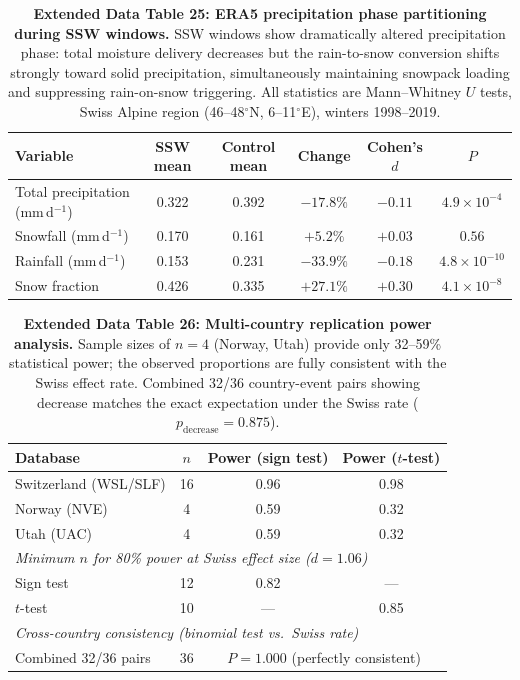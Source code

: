 \documentclass[11pt,letterpaper]{article}
\begin{document}
\begin{table}[!ht]
\centering
\caption{\textbf{Extended Data Table 25: ERA5 precipitation phase partitioning during SSW windows.}
SSW windows show dramatically altered precipitation phase: total moisture delivery decreases but the rain-to-snow conversion shifts strongly toward solid precipitation, simultaneously maintaining snowpack loading and suppressing rain-on-snow triggering. All statistics are Mann--Whitney $U$ tests, Swiss Alpine region (46--48$^\circ$N, 6--11$^\circ$E), winters 1998--2019.}
\label{tab:precip_phase}
\small
\begin{tabular}{lccccc}
\toprule
Variable & SSW mean & Control mean & Change & Cohen's $d$ & $P$ \\
\midrule
Total precipitation (mm\,d$^{-1}$) & 0.322 & 0.392 & $-17.8\%$ & $-0.11$ & $4.9 \times 10^{-4}$ \\
Snowfall (mm\,d$^{-1}$) & 0.170 & 0.161 & $+5.2\%$ & $+0.03$ & $0.56$ \\
Rainfall (mm\,d$^{-1}$) & 0.153 & 0.231 & $-33.9\%$ & $-0.18$ & $4.8 \times 10^{-10}$ \\
Snow fraction & 0.426 & 0.335 & $+27.1\%$ & $+0.30$ & $4.1 \times 10^{-8}$ \\
\bottomrule
\end{tabular}
\end{table}

\begin{table}[!ht]
\centering
\caption{\textbf{Extended Data Table 26: Multi-country replication power analysis.}
Sample sizes of $n = 4$ (Norway, Utah) provide only 32--59\% statistical power; the observed proportions are fully consistent with the Swiss effect rate. Combined 32/36 country-event pairs showing decrease matches the exact expectation under the Swiss rate ($p_{\mathrm{decrease}} = 0.875$).}
\label{tab:power}
\small
\begin{tabular}{lccc}
\toprule
Database & $n$ & Power (sign test) & Power ($t$-test) \\
\midrule
Switzerland (WSL/SLF) & 16 & 0.96 & 0.98 \\
Norway (NVE) & 4 & 0.59 & 0.32 \\
Utah (UAC) & 4 & 0.59 & 0.32 \\
\midrule
\multicolumn{4}{l}{\textit{Minimum $n$ for 80\% power at Swiss effect size ($d = 1.06$)}} \\
Sign test & 12 & 0.82 & --- \\
$t$-test & 10 & --- & 0.85 \\
\midrule
\multicolumn{4}{l}{\textit{Cross-country consistency (binomial test vs.\ Swiss rate)}} \\
Combined 32/36 pairs & 36 & \multicolumn{2}{c}{$P = 1.000$ (perfectly consistent)} \\
\bottomrule
\end{tabular}
\end{table}
\end{document}
